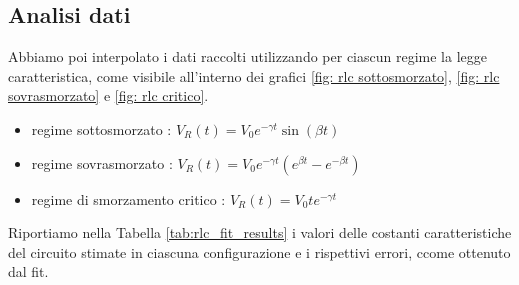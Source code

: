 \documentclass[a4paper]{article}
\begin{document}
\subsection{Analisi dati}
Abbiamo poi interpolato i dati raccolti utilizzando per ciascun regime la legge caratteristica, come visibile all'interno dei grafici \ref{fig: rlc sottosmorzato}, \ref{fig: rlc sovrasmorzato} e \ref{fig: rlc critico}.
\begin{itemize}
	\item regime sottosmorzato : \(V_R(t) = V_0 e^{-\gamma t }\sin (\beta t)\)
	\item regime sovrasmorzato : \(V_R(t) = V_0 e^{-\gamma t } (e^{\beta t} - e^{-\beta t}) \)
	\item regime di smorzamento critico : \(V_R(t) = V_0 t e^{-\gamma t } \)
\end{itemize}
Riportiamo nella Tabella \ref{tab:rlc_fit_results} i valori delle costanti caratteristiche del circuito stimate in ciascuna configurazione e i rispettivi errori, ccome ottenuto dal fit.
\end{document}

